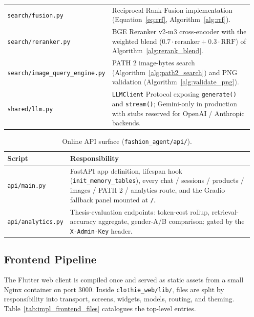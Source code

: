 \begin{table}[H]
\begin{tabular}{p{6.0cm} p{8.6cm}}
\texttt{search/fusion.py} & Reciprocal-Rank-Fusion implementation (Equation~\ref{eq:rrf}, Algorithm~\ref{alg:rrf}). \\
\texttt{search/reranker.py} & BGE Reranker v2-m3 cross-encoder with the weighted blend ($0.7 \cdot \text{reranker} + 0.3 \cdot \text{RRF}$) of Algorithm~\ref{alg:rerank_blend}. \\
\texttt{search/image\_query\_engine.py} & PATH 2 image-bytes search (Algorithm~\ref{alg:path2_search}) and PNG validation (Algorithm~\ref{alg:validate_png}). \\
\texttt{shared/llm.py} & \texttt{LLMClient} Protocol exposing \texttt{generate()} and \texttt{stream()}; Gemini-only in production with stubs reserved for OpenAI / Anthropic backends. \\
\bottomrule
\end{tabular}
\end{table}

\begin{table}[H]
\centering
\caption{Online API surface (\texttt{fashion\_agent/api/}).}
\label{tab:impl_online_api_scripts}
\small
\begin{tabular}{p{6.0cm} p{8.6cm}}
\toprule
\textbf{Script} & \textbf{Responsibility} \\
\midrule
\texttt{api/main.py} & FastAPI app definition, lifespan hook (\texttt{init\_memory\_tables}), every chat / sessions / products / images / PATH 2 / analytics route, and the Gradio fallback panel mounted at \texttt{/}. \\
\texttt{api/analytics.py} & Thesis-evaluation endpoints: token-cost rollup, retrieval-accuracy aggregate, gender-A/B comparison; gated by the \texttt{X-Admin-Key} header. \\
\bottomrule
\end{tabular}
\end{table}

\subsection{Frontend Pipeline}

The Flutter web client is compiled once and served as static assets from a small Nginx container on port 3000. Inside \texttt{clothie\_web/lib/}, files are split by responsibility into transport, screens, widgets, models, routing, and theming. Table~\ref{tab:impl_frontend_files} catalogues the top-level entries.

